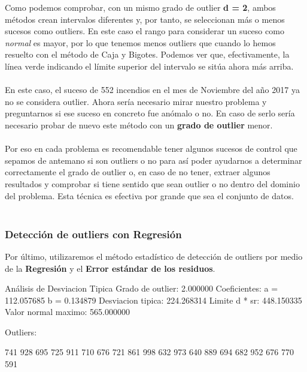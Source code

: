 \documentclass [a4paper] {article}
\begin{document}
Como podemos comprobar, con un mismo grado de outlier \textbf{d = 2}, ambos métodos crean intervalos
diferentes y, por tanto, se seleccionan más o menos sucesos como outliers. En este caso el rango
para considerar un suceso como \textit{normal} es mayor, por lo que tenemos menos outliers que
cuando lo hemos resuelto con el método de Caja y Bigotes. Podemos ver que, efectivamente, la línea
verde indicando el límite superior del intervalo se sitúa ahora más arriba.
\\\\
En este caso, el suceso de 552 incendios en el mes de Noviembre del año 2017 ya no se considera
outlier. Ahora sería necesario mirar nuestro problema y preguntarnos si ese suceso en concreto
fue anómalo o no. En caso de serlo sería necesario probar de nuevo este método con un 
\textbf{grado de outlier} menor.
\\\\
Por eso en cada problema es recomendable tener algunos sucesos de control que sepamos de antemano
si son outliers o no para así poder ayudarnos a determinar correctamente el grado de outlier o,
en caso de no tener, extraer algunos resultados y comprobar si tiene sentido que sean outlier o no
dentro del dominio del problema. Esta técnica es efectiva por grande que sea el conjunto de datos.
\\\\

\subsubsection{Detección de outliers con Regresión}
Por último, utilizaremos el método estadístico de detección de outliers por medio de la
\textbf{Regresión} y el \textbf{Error estándar de los residuos}.

\begin{Schunk}
\end{Schunk}
\begin{Schunk}
\begin{Soutput}
Análisis de Desviacion Tipica
	Grado de outlier: 2.000000
	Coeficientes:
		a = 112.057685
		b = 0.134879
	Desviacion tipica: 224.268314
	Limite d * sr: 448.150335
	Valor normal maximo: 565.000000

Outliers:
\end{Soutput}
\begin{Soutput}
741 928 695 725 911 710 676 721 861 998 632 973 640 889 694 682 952 676 770 591
\end{Soutput}
\end{Schunk}
\end{document}

